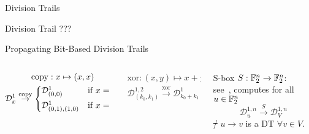 \begin{frame}{Division Trails}
    \begin{block}{Division Trail}
        ???
    \end{block}
    \begin{block}{Propagating Bit-Based Division Trails}
    \begin{columns}
    \begin{column}{0.3\textwidth}
        \vspace*{-10pt}
        \begin{gather*}
            \mathrm{copy} : x \mapsto (x, x) \\
            \mathcal{D}^1_x \stackrel{\mathrm{copy}}{\to} \begin{cases*}
                \mathcal{D}^1_{(0,0)}       & if $x = 0$ \\
                \mathcal{D}^1_{(0,1),(1,0)} & if $x = 1$
            \end{cases*}
        \end{gather*}
        \vspace*{-3pt}
    \end{column}
    \begin{column}{0.3\textwidth}
        \vspace*{-10pt}
        \begin{gather*}
            \mathrm{xor} : (x,y) \mapsto x + y \\
            \mathcal{D}^{1,2}_{(k_0,k_1)} \stackrel{\mathrm{xor}}{\to} \mathcal{D}^1_{k_0+k_1}
        \end{gather*}
    \end{column}
    \begin{column}{0.3\textwidth}
        \centering
        S-box $S : \mathbb{F}_2^n \to \mathbb{F}_2^n$:\\
        see~\cite[Algorithm~2]{AC:XZBL16},
        computes for all $u \in \mathbb{F}_2^n$\\
        \vspace*{-15pt}
        \begin{equation*}
            \mathcal{D}^{1,n}_{u} \stackrel{S}{\to} \mathcal{D}^{1,n}_V
        \end{equation*}
        \st/ $u \to v$ is a DT $\forall v \in V$.
    \end{column}
    \end{columns}
    \end{block}
\end{frame}

